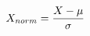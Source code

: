 \documentclass[preview]{standalone}
\begin{document}
\begin{align*}
\special{dvisvgm:raw <g id='unique000'>}X_{norm} = \frac{X - \mu}{\sigma}\special{dvisvgm:raw </g>}
\end{align*}
\end{document}
